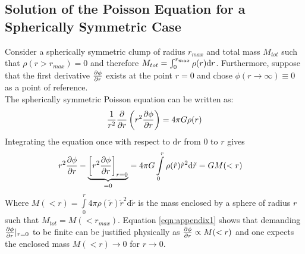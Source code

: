 \begin{appendices}
\section{Solution of the Poisson Equation for a Spherically Symmetric Case}\label{app:sol_phi}

Consider a spherically symmetric clump of radius $r_{max}$ and total mass $M_{tot}$ such that $\rho(r > r_{max}) = 0$ and therefore $M_{tot} = \int_0^{r_{max}}\rho(r)\mathrm{d} r$.
Furthermore, suppose that the first derivative $\frac{\partial \phi}{\partial r}$ exists at the point $r=0$ and chose $\phi (r \rightarrow \infty ) \equiv 0$ as a point of reference.\\
The spherically symmetric Poisson equation can be written as:
\begin{equation}
	\frac{1}{r^2}\frac{\partial}{\partial r} \left( r^2  \frac{\partial \phi}{\partial r} \right) = 4 \pi G \rho(r)
\end{equation}
%
Integrating the equation once with respect to $\mathrm{d}r$ from $0$ to $r$ gives
\begin{align}
	r^2 \frac{\partial \phi}{\partial r} - 
	\underbrace{ 
			\left[r^2 \frac{\partial \phi}{\partial r} \right]_{r=0}
		}_ {=0}
	 &= 4 \pi G \int\limits_0^r \rho(\tilde{r})\tilde{r}^2 \mathrm{d}\tilde{r} = G M(<r) \label{eqn:appendix1}
\end{align}
%
Where $M(<r) = \int\limits_0^r 4 \pi \rho(\tilde{r})\tilde{r}^2 \mathrm{d}\tilde{r} $ is the mass enclosed by a sphere of radius $r$ such that $M_{tot} = M(<r_{max})$.
Equation \ref{eqn:appendix1} shows that demanding $\frac{\partial \phi}{\partial r} |_{r=0}$ to be finite can be justified physically as $\frac{\partial \phi}{\partial r} \propto  M(<r)$ and one expects the enclosed mass $M(<r)\rightarrow 0$ for $r \rightarrow 0$.



\end{appendices}
